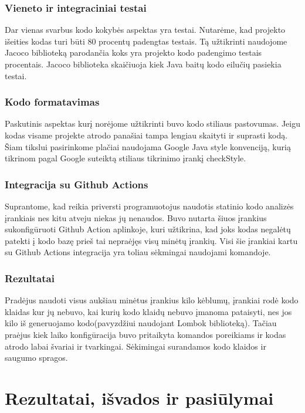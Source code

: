 \documentclass{VUMIFPSkursinis}
\begin{document}
		\subsubsection{Vieneto ir integraciniai testai}
			Dar vienas svarbus kodo kokybės aspektas yra testai.
			Nutarėme, kad projekto išeities kodas turi būti 80 procentų padengtas testais.
			Tą užtikrinti naudojome Jacoco biblioteką parodančia koks yra projekto kodo padengimo testais procentais.
			Jacoco biblioteka skaičiuoja kiek Java baitų kodo eilučių pasiekia testai.
		\subsubsection{Kodo formatavimas}
			Paskutinis aspektas kurį norėjome užtikrinti buvo kodo stiliaus pastovumas.
			Jeigu kodas visame projekte atrodo panašiai tampa lengiau skaityti ir suprasti kodą.
			Šiam tikslui pasirinkome plačiai naudojama Google Java style konvenciją, kurią tikrinom pagal Google suteiktą stiliaus tikrinimo įrankį checkStyle. 
		\subsubsection{Integracija su Github Actions}
			Suprantome, kad reikia priversti programuotojus naudotis statinio kodo analizės įrankiais nes kitu atveju niekas jų nenaudos.
			Buvo nutarta šiuos įrankius sukonfigūruoti Github Action aplinkoje, kuri užtikrina, kad joks kodas negalėtų patekti į kodo bazę prieš tai nepraėjęs visų minėtų įrankių.
			Visi šie įrankiai kartu su Github Actions integracija yra toliau sėkmingai naudojami komandoje.
		\subsubsection{Rezultatai}
			Pradėjus naudoti visus aukšiau minėtus įrankius kilo kėblumų, įrankiai rodė kodo klaidas kur jų nebuvo, kai kurių kodo klaidų
			nebuvo įmanoma pataisyti, nes jos kilo iš generuojamo kodo(pavyzdžiui  naudojant Lombok biblioteką).
			Tačiau praėjus kiek laiko konfigūracija buvo pritaikyta komandos poreikiams ir kodas atrodo labai švariai ir tvarkingai.
			Sėkimingai surandamos kodo klaidos ir saugumo spragos.

		
\section{Rezultatai, išvados ir pasiūlymai}
\end{document}
